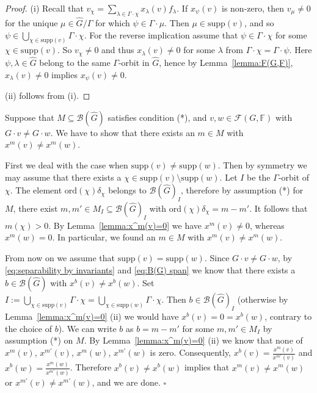 \documentclass[12pt, oneside]{amsart}
\newenvironment{proofof}[1]{\noindent{\it Proof of
#1.}}{\hfill$\square$\\\mbox{}}
\def\FF{\mathbb{F}}
\begin{document}
\begin{proof} (i)  Recall that  $v_\chi=\sum_{\lambda\in \Gamma\cdot \chi}x_\lambda(v)f_\lambda$. 
If $x_\psi(v)$ is non-zero, then $v_\mu\neq 0$ for the unique $\mu\in \widehat G/\Gamma$ for which 
$\psi\in \Gamma\cdot \mu$. Then $\mu\in \mathrm{supp}(v)$, and so $\psi\in \bigcup_{\chi\in \mathrm{supp}(v)}\Gamma\cdot\chi$. 
For the reverse implication assume that $\psi\in \Gamma\cdot\chi$ for some $\chi\in \mathrm{supp}(v)$. So $v_\chi\neq 0$ 
and thus $x_\lambda(v)\neq 0$ for some $\lambda$ from $\Gamma\cdot\chi=\Gamma\cdot \psi$. 
Here $\psi,\lambda\in\widehat G$ belong to the same $\Gamma$-orbit in $\widehat G$, hence by Lemma~\ref{lemma:F(G,F)},   
$x_\lambda(v)\neq 0$ implies $x_\psi(v)\neq 0$. 

(ii) follows from (i). 
\end{proof}

\begin{proofof}{Theorem~\ref{thm:separating monomials}}
Suppose that $M\subseteq\mathcal{B}(\widehat G)$ satisfies condition (*), and 
$v,w\in \mathcal{F}(G,\FF)$ with $G\cdot v\neq G\cdot w$. 
We have to show that there exists an $m\in M$ with $x^m(v)\neq x^m(w)$. 

First we deal with the case when $\mathrm{supp}(v)\neq \mathrm{supp}(w)$. 
Then by symmetry we may assume that there exists a $\chi\in \mathrm{supp}(v)\setminus\mathrm{supp}(w)$. 
Let $I$ be the $\Gamma$-orbit of $\chi$. The element $\mathrm{ord}(\chi)\delta_{\chi}$ belongs to 
$\mathcal{B}(\widehat G)_I$, therefore by assumption (*) for $M$, there exist $m,m'\in M_I\subseteq \mathcal{B}(\widehat G)_I$ with 
$\mathrm{ord}(\chi)\delta_{\chi}=m-m'$. It follows that $m(\chi)>0$.  
By Lemma~\ref{lemma:x^m(v)=0} we have $x^m(v)\neq 0$, whereas $x^m(w)=0$. 
In particular, we found an $m\in M$ with $x^m(v)\neq x^m(w)$. 

From now on we assume that $\mathrm{supp}(v)=\mathrm{supp}(w)$. 
Since $G\cdot v\neq G\cdot w$, by \eqref{eq:separability by invariants} and \eqref{eq:B(G) span} we know that  
there exists a $b\in \mathcal{B}(\widehat G)$ with $x^b(v)\neq x^b(w)$. 
Set $I:= \bigcup_{\chi\in \mathrm{supp}(v)}\Gamma\cdot\chi= \bigcup_{\chi\in \mathrm{supp}(w)}\Gamma\cdot\chi$. 
Then $b\in \mathcal{B}(\widehat G)_I$ 
(otherwise by Lemma~\ref{lemma:x^m(v)=0}  (ii) 
we would have $x^b(v)=0=x^b(w)$, contrary to the choice of $b$). 
We can write $b$ as $b=m-m'$ for some $m,m'\in M_I$ by assumption (*) on $M$. 
By Lemma~\ref{lemma:x^m(v)=0} (ii) we know that none of $x^m(v)$, $x^{m'}(v)$, $x^m(w)$, $x^{m'}(w)$ is zero. 
Consequently, $x^b(v)=\frac{x^m(v)}{x^{m'}(v)}$ and  $x^b(w)=\frac{x^m(w)}{x^{m'}(w)}$. 
Therefore $x^b(v)\neq x^b(w)$ implies that $x^m(v)\neq x^m(w)$ or $x^{m'}(v)\neq x^{m'}(w)$, and we are done. 
\end{proofof} 
\end{document}
